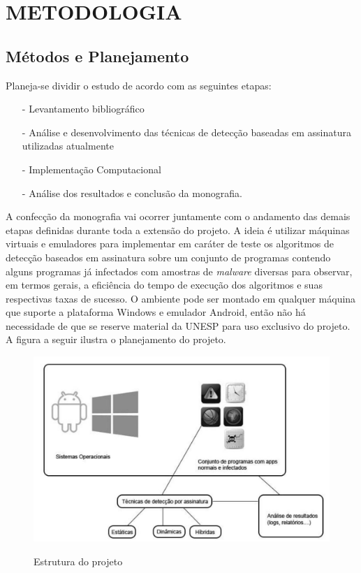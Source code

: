 
\chapter{METODOLOGIA}
\label{c.metodologia}

\section{Métodos e Planejamento}
\label{s.metodoseplan}

Planeja-se dividir o estudo de acordo com as seguintes etapas:

\begin{itemize}
	\item[-] Levantamento bibliográfico
	\item[-] Análise e desenvolvimento das técnicas de detecção baseadas em assinatura utilizadas atualmente
	\item[-] Implementação Computacional
	\item[-] Análise dos resultados e conclusão da monografia.
\end{itemize}
A confecção da monografia vai ocorrer juntamente com o andamento das demais
etapas definidas durante toda a extensão do projeto. A ideia é utilizar
máquinas virtuais e emuladores para implementar em caráter de teste os
algoritmos de detecção baseados em assinatura sobre um conjunto de programas
contendo alguns programas já infectados com amostras de \textit{malware} diversas para
observar, em termos gerais, a eficiência do tempo de execução dos algoritmos e
suas respectivas taxas de sucesso. O ambiente pode ser montado em qualquer
máquina que suporte a plataforma Windows e emulador Android, então não há
necessidade de que se reserve material da UNESP para uso exclusivo do projeto.
A figura a seguir ilustra o planejamento do projeto.
\begin{figure}[H]
\caption{\small Estrutura do projeto}
\centering
\includegraphics[scale=0.4]{figs/fig2}
\label{f.estrutura_projeto}
\end{figure}

